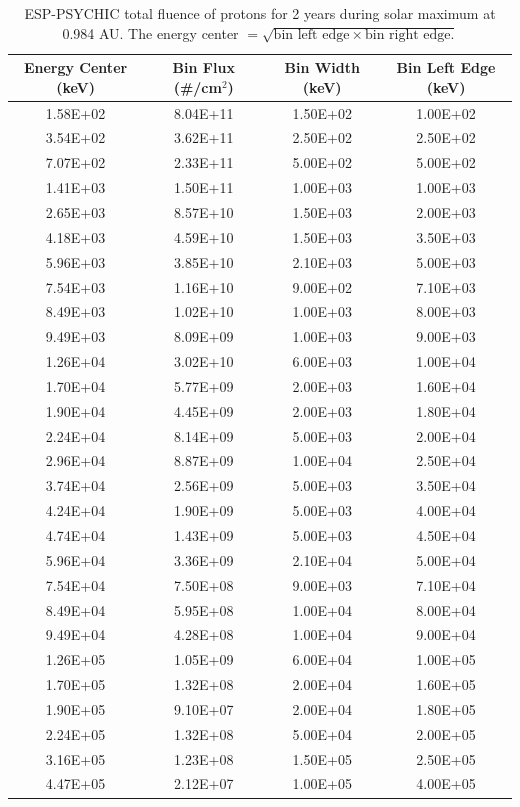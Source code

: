 \documentclass{hitec}
\begin{document}
\begin{table}[!h]\centering
	\caption{ESP-PSYCHIC total fluence of protons for 2 years during solar maximum at 0.984 AU. The energy center $=\sqrt{\text{bin left edge}\times\text{bin right edge}.}$ }\label{tab:ESP-PSYCHIC_2-year_subL1}
	\begin{tabular}{|c | c | c | c |}\hline
		Energy Center (keV) & Bin Flux (\#/cm$^2$) & Bin Width (keV) & Bin Left Edge (keV) \\\hline

1.58E+02&8.04E+11&1.50E+02&1.00E+02\\\hline
3.54E+02&3.62E+11&2.50E+02&2.50E+02\\\hline
7.07E+02&2.33E+11&5.00E+02&5.00E+02\\\hline
1.41E+03&1.50E+11&1.00E+03&1.00E+03\\\hline
2.65E+03&8.57E+10&1.50E+03&2.00E+03\\\hline
4.18E+03&4.59E+10&1.50E+03&3.50E+03\\\hline
5.96E+03&3.85E+10&2.10E+03&5.00E+03\\\hline
7.54E+03&1.16E+10&9.00E+02&7.10E+03\\\hline
8.49E+03&1.02E+10&1.00E+03&8.00E+03\\\hline
9.49E+03&8.09E+09&1.00E+03&9.00E+03\\\hline
1.26E+04&3.02E+10&6.00E+03&1.00E+04\\\hline
1.70E+04&5.77E+09&2.00E+03&1.60E+04\\\hline
1.90E+04&4.45E+09&2.00E+03&1.80E+04\\\hline
2.24E+04&8.14E+09&5.00E+03&2.00E+04\\\hline
2.96E+04&8.87E+09&1.00E+04&2.50E+04\\\hline
3.74E+04&2.56E+09&5.00E+03&3.50E+04\\\hline
4.24E+04&1.90E+09&5.00E+03&4.00E+04\\\hline
4.74E+04&1.43E+09&5.00E+03&4.50E+04\\\hline
5.96E+04&3.36E+09&2.10E+04&5.00E+04\\\hline
7.54E+04&7.50E+08&9.00E+03&7.10E+04\\\hline
8.49E+04&5.95E+08&1.00E+04&8.00E+04\\\hline
9.49E+04&4.28E+08&1.00E+04&9.00E+04\\\hline
1.26E+05&1.05E+09&6.00E+04&1.00E+05\\\hline
1.70E+05&1.32E+08&2.00E+04&1.60E+05\\\hline
1.90E+05&9.10E+07&2.00E+04&1.80E+05\\\hline
2.24E+05&1.32E+08&5.00E+04&2.00E+05\\\hline
3.16E+05&1.23E+08&1.50E+05&2.50E+05\\\hline
4.47E+05&2.12E+07&1.00E+05&4.00E+05\\\hline
	\end{tabular}
\end{table}
\clearpage %
\end{document}

